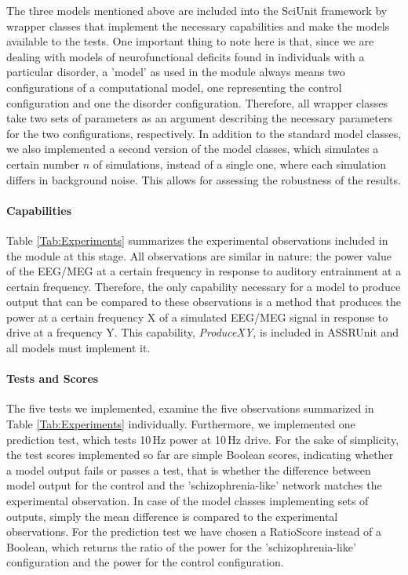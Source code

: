 \documentclass[a4paper,10pt]{article}
\begin{document}
The three models mentioned above are included into the SciUnit framework by wrapper classes that implement the necessary capabilities and make the models available to the tests.
One important thing to note here is that, since we are dealing with models of neurofunctional deficits found in individuals with a particular disorder, a 'model' as used in the module always means two configurations of a computational 
model, one representing the control configuration and one the disorder configuration. Therefore, all wrapper classes take two sets of parameters as an argument describing the necessary parameters
for the two configurations, respectively.
In addition to the standard model classes, we also implemented a second version of the model classes, which simulates a certain number $n$ of simulations, instead of a single one, 
where each simulation differs in background noise. This allows for assessing the robustness of the results.


\paragraph{Capabilities}
Table \ref{Tab:Experiments} summarizes the experimental observations included in the module at this stage. All observations are similar in nature: the power value of the EEG/MEG 
at a certain frequency in response to auditory entrainment at a certain frequency. Therefore, the only capability necessary for a model to produce output that can be compared to these observations
is a method that produces the power at a certain frequency X of a simulated EEG/MEG signal in response to drive at a frequency Y. This capability, \textit{ProduceXY}, is included in ASSRUnit and all models
must implement it.

\paragraph{Tests and Scores}
The five tests we implemented, examine the five observations summarized in Table \ref{Tab:Experiments} individually. Furthermore, we implemented one 
prediction test, which tests 10\,Hz power at 10\,Hz drive.
For the sake of simplicity, the test scores implemented so far are simple Boolean scores, indicating whether a model output fails or passes a test, that is whether the difference 
between model output for the control and the 'schizophrenia-like' network
matches the experimental observation. In case of the model classes implementing sets of outputs, simply the mean difference is compared to the experimental observations.
For the prediction test we have chosen a RatioScore instead of a Boolean, which
returns the ratio of the power for the 'schizophrenia-like'  configuration and the power for the control configuration.
\end{document}
